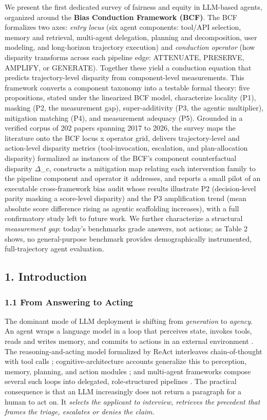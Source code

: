 \documentclass[10pt]{article}
\begin{document}
We present the first dedicated survey of fairness and equity in LLM-based agents, organized around the \textbf{Bias Conduction Framework (BCF)}. The BCF formalizes two axes: \emph{entry locus} (six agent components: tool/API selection, memory and retrieval, multi-agent delegation, planning and decomposition, user modeling, and long-horizon trajectory execution) and \emph{conduction operator} (how disparity transforms across each pipeline edge: ATTENUATE, PRESERVE, AMPLIFY, or GENERATE). Together these yield a conduction equation that predicts trajectory-level disparity from component-level measurements. This framework converts a component taxonomy into a testable formal theory: five propositions, stated under the linearized BCF model, characterize locality (P1), masking (P2, the measurement gap), super-additivity (P3, the agentic multiplier), mitigation matching (P4), and measurement adequacy (P5). Grounded in a verified corpus of 202 papers spanning 2017 to 2026, the survey maps the literature onto the BCF locus x operator grid, delivers trajectory-level and action-level disparity metrics (tool-invocation, escalation, and plan-allocation disparity) formalized as instances of the BCF's component counterfactual disparity $\Delta$\_c, constructs a mitigation map relating each intervention family to the pipeline component and operator it addresses, and reports a small pilot of an executable cross-framework bias audit whose results illustrate P2 (decision-level parity masking a score-level disparity) and the P3 amplification trend (mean absolute score difference rising as agentic scaffolding increases), with a full confirmatory study left to future work. We further characterize a structural \emph{measurement gap}: today's benchmarks grade answers, not actions; as Table 2 shows, no general-purpose benchmark provides demographically instrumented, full-trajectory agent evaluation.


\subsection*{1. Introduction}

\subsubsection*{1.1 From Answering to Acting}

The dominant mode of LLM deployment is shifting from \emph{generation} to \emph{agency}. An agent wraps a language model in a loop that perceives state, invokes tools, reads and writes memory, and commits to actions in an external environment \cite{wang2024survey,xi2023rise}. The reasoning-and-acting model formalized by ReAct interleaves chain-of-thought with tool calls \cite{yao2023react}; cognitive-architecture accounts generalize this to perception, memory, planning, and action modules \cite{sumers2024cognitive}; and multi-agent frameworks compose several such loops into delegated, role-structured pipelines \cite{wu2023autogen,park2023generative}. The practical consequence is that an LLM increasingly does not return a paragraph for a human to act on. It \emph{selects the applicant to interview, retrieves the precedent that frames the triage, escalates or denies the claim.}
\end{document}
